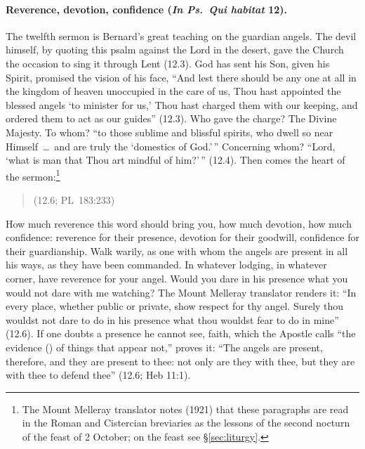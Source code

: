 \paragraph{Reverence, devotion, confidence (\emph{In Ps.\ Qui habitat} 12).}
The twelfth sermon is Bernard's great teaching on the guardian angels. The
devil himself, by quoting this psalm against the Lord in the desert, gave
the Church the occasion to sing it through Lent (12.3). God has sent his
Son, given his Spirit, promised the vision of his face, ``And lest there
should be any one at all in the kingdom of heaven unoccupied in the care of
us, Thou hast appointed the blessed angels `to minister for us,' Thou hast
charged them with our keeping, and ordered them to act as our guides''
(12.3). Who gave the charge? The Divine Majesty. To whom? ``to those sublime
and blissful spirits, who dwell so near Himself~\dots\ and are truly the
`domestics of God.'\,'' Concerning whom? ``Lord, `what is man that Thou art
mindful of him?'\,'' (12.4). Then comes the heart of the sermon:\footnote{The Mount Melleray translator notes
(1921) that these paragraphs are read in the Roman and Cistercian breviaries
as the lessons of the second nocturn of the feast of 2 October; on the feast
see \S\ref{sec:liturgy}.}

\begin{quote}
 (12.6; PL~183:233)
\end{quote}

\noindent How much reverence this word should bring you, how much devotion,
how much confidence: reverence for their presence, devotion for their
goodwill, confidence for their guardianship. Walk warily, as one with whom
the angels are present in all his ways, as they have been commanded. In
whatever lodging, in whatever corner, have reverence for your angel. Would
you dare in his presence what you would not dare with me watching? The
Mount Melleray translator renders it: ``In every place, whether public or
private, show respect for thy angel. Surely thou wouldst not dare to do in
his presence what thou wouldst fear to do in mine'' (12.6). If one doubts a
presence he cannot see, faith, which the Apostle calls ``the evidence ()
of things that appear not,'' proves it: ``The angels are present, therefore,
and they are present to thee: not only are they with thee, but they are
with thee to defend thee'' (12.6; Heb 11:1).

